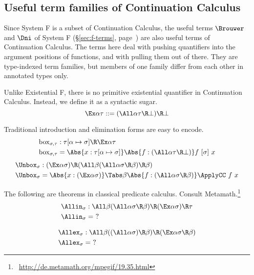 \documentclass{amsart}
\begin{document}
\nc{}

\FRules

\DoubleNegationElimination

\ExistentialElimination

\subsection{Useful term families of Continuation Calculus}

Since System F is a subset of Continuation Calculus, the useful
terms $\Brouwer$ and $\Dni$ of System F (\S\ref{sec:f-terms},
page~\pageref{sec:f-terms}) are also useful terms of Continuation
Calculus. The terms here deal with pushing quantifiers into the
argument positions of functions, and with pulling them out of
there. They are type-indexed term families, but members of one
family differ from each other in annotated types only.

Unlike Existential F, there is no primitive existential
quantifier in Continuation Calculus. Instead, we define it as a
syntactic sugar.
\[
\Ex\alpha \tau ::= (\All\alpha \tau \R \bot) \R \bot
\]

Traditional introduction and elimination forms are easy to
encode.
\begin{align*}
\Box_{\sigma,\tau} & :
  \tau[\alpha\mapsto\sigma] \R \Ex\alpha\tau
  \\
\Box_{\sigma,\tau} & =
  \Abs{x : \tau[\alpha\mapsto\sigma]}
  \Abs{f : (\All\alpha \tau \R \bot)}
  f~[\sigma]~x
\end{align*}
%
\begin{align*}
\Unbox_{\sigma} & :
  (\Ex\alpha\sigma) \R
  (\All\beta (\All\alpha \sigma \R \beta) \R \beta)
  \\
\Unbox_{\sigma} & =
  \Abs{x : (\Ex\alpha\sigma)}
  \Tabs\beta
  \Abs{f : (\All\alpha \sigma \R \beta)}
  \ApplyCC~f~x
\end{align*}

The following are theorems in classical predicate calculus.
Consult Metamath.\footnote{
~\url{http://de.metamath.org/mpegif/19.35.html}
}
\begin{align*}
\Allin_\sigma & : \All\beta
  (\All\alpha \sigma\R\beta) \R
  (\Ex\alpha \sigma) \R \tau
  \\
\Allin_\sigma & = ~?
\end{align*}

\begin{align*}
\Allex_\sigma & : \All\beta
  ((\All\alpha\sigma) \R \beta) \R
  (\Ex\alpha \sigma \R \beta)
  \\
\Allex_\sigma & = ~?
\end{align*}
\end{document}
